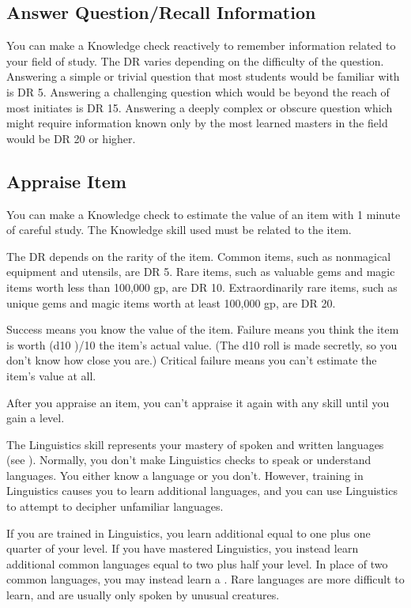     \subsection{Answer Question/Recall Information}
        You can make a Knowledge check reactively to remember information related to your field of study. The DR varies depending on the difficulty of the question. Answering a simple or trivial question that most students would be familiar with is DR 5. Answering a challenging question which would be beyond the reach of most initiates is DR 15. Answering a deeply complex or obscure question which might require information known only by the most learned masters in the field would be DR 20 or higher.

    \subsection{Appraise Item}
        You can make a Knowledge check to estimate the value of an item with 1 minute of careful study. The Knowledge skill used must be related to the item.

        The DR depends on the rarity of the item. Common items, such as nonmagical equipment and utensils, are DR 5. Rare items, such as valuable gems and magic items worth less than 100,000 gp, are DR 10. Extraordinarily rare items, such as unique gems and magic items worth at least 100,000 gp, are DR 20.

        Success means you know the value of the item. Failure means you think the item is worth (d10 )/10 \x the item's actual value. (The d10 roll is made secretly, so you don't know how close you are.) Critical failure means you can't estimate the item's value at all.

        After you appraise an item, you can't appraise it again with any skill until you gain a level.

\newpage
{}
        The Linguistics skill represents your mastery of spoken and written languages (see ).
        Normally, you don't make Linguistics checks to speak or understand languages.
        You either know a language or you don't.
        However, training in Linguistics causes you to learn additional languages, and you can use Linguistics to attempt to decipher unfamiliar languages.

        \label{Learning Languages}
        If you are trained in Linguistics, you learn additional  equal to one plus one quarter of your level.
        If you have mastered Linguistics, you instead learn additional common languages equal to two plus half your level.
        In place of two common languages, you may instead learn a .
        Rare languages are more difficult to learn, and are usually only spoken by unusual creatures.

